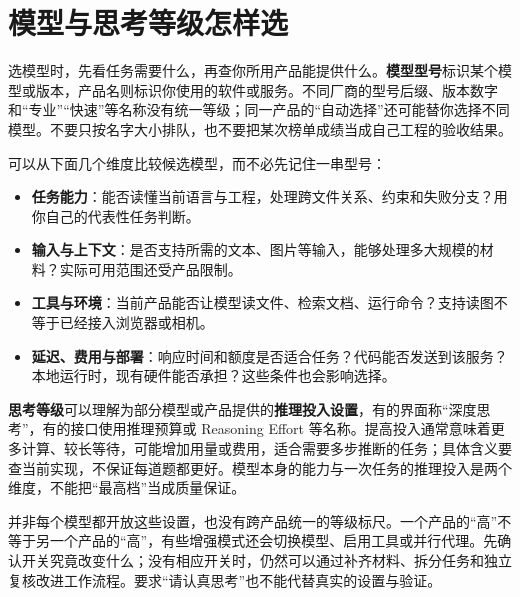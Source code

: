 \section{模型与思考等级怎样选}
\label{sec:ai-model-choice}

选模型时，先看任务需要什么，再查你所用产品能提供什么。\textbf{模型型号}标识某个模型或版本，产品名则标识你使用的软件或服务。不同厂商的型号后缀、版本数字和“专业”“快速”等名称没有统一等级；同一产品的“自动选择”还可能替你选择不同模型。不要只按名字大小排队，也不要把某次榜单成绩当成自己工程的验收结果。

可以从下面几个维度比较候选模型，而不必先记住一串型号：
\begin{itemize}
    \item \textbf{任务能力}：能否读懂当前语言与工程，处理跨文件关系、约束和失败分支？用你自己的代表性任务判断。
    \item \textbf{输入与上下文}：是否支持所需的文本、图片等输入，能够处理多大规模的材料？实际可用范围还受产品限制。
    \item \textbf{工具与环境}：当前产品能否让模型读文件、检索文档、运行命令？支持读图不等于已经接入浏览器或相机。
    \item \textbf{延迟、费用与部署}：响应时间和额度是否适合任务？代码能否发送到该服务？本地运行时，现有硬件能否承担？这些条件也会影响选择。
\end{itemize}

\textbf{思考等级}可以理解为部分模型或产品提供的\textbf{推理投入设置}，有的界面称“深度思考”，有的接口使用推理预算或 Reasoning Effort 等名称。提高投入通常意味着更多计算、较长等待，可能增加用量或费用，适合需要多步推断的任务；具体含义要查当前实现，不保证每道题都更好。模型本身的能力与一次任务的推理投入是两个维度，不能把“最高档”当成质量保证。

并非每个模型都开放这些设置，也没有跨产品统一的等级标尺。一个产品的“高”不等于另一个产品的“高”，有些增强模式还会切换模型、启用工具或并行代理。先确认开关究竟改变什么；没有相应开关时，仍然可以通过补齐材料、拆分任务和独立复核改进工作流程。要求“请认真思考”也不能代替真实的设置与验证。

